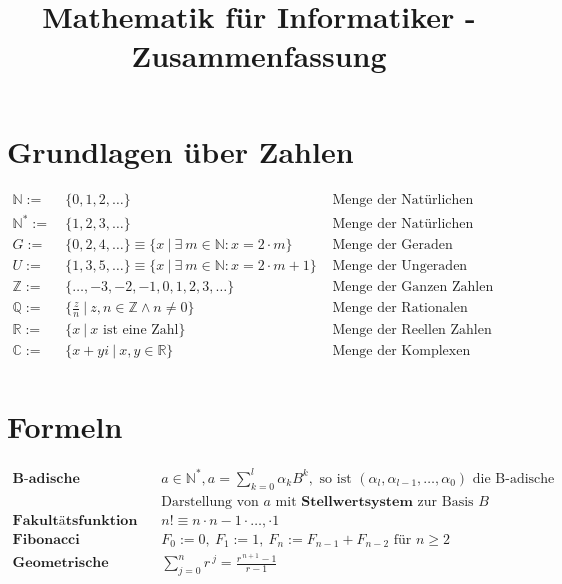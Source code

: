 \documentclass{article}
\title{Mathematik f\"ur Informatiker - Zusammenfassung}
\begin{document}
	\section*{Grundlagen \"uber Zahlen}
		\begin{align*}
			\mathbb{N} := &\ \{0, 1, 2, \ldots\} & \text{ Menge der Nat\"urlichen Zahlen}\\
			\mathbb{N}^* := &\ \{1, 2, 3, \ldots\} & \text{ Menge der Nat\"urlichen Zahlen ohne Null}\\
			G := &\ \{0, 2, 4, \ldots\} \equiv \{x\ |\ \exists\ m \in \mathbb{N}: x = 2\cdot m\} & \text{ Menge der Geraden Nat\"urliche Zahlen}\\
			U := &\ \{1, 3, 5, \ldots\} \equiv \{x\ |\ \exists\ m \in \mathbb{N}: x = 2\cdot m + 1\} & \text{ Menge der Ungeraden Nat\"urliche Zahlen}\\
			\mathbb{Z} := &\ \{\ldots, -3, -2, -1, 0, 1, 2, 3, \ldots\} & \text{ Menge der Ganzen Zahlen}\\
			\mathbb{Q} := &\ \{\frac{z}{n}\ |\ z, n \in \mathbb{Z} \wedge n \neq 0\} & \text{ Menge der Rationalen Zahlen}\\
			\mathbb{R} := &\ \{x\ |\ x \text{ ist eine Zahl}\} & \text{ Menge der Reellen Zahlen}\\
			\mathbb{C} := &\ \{x + yi\ |\ x, y \in \mathbb{R} \} & \text{ Menge der Komplexen Zahlen}\\
		\end{align*}
	\section*{Formeln}
		\begin{align*}
			\textbf{B-adische Darstellung } & a \in \mathbb{N}^*, a = \sum\limits_{k=0}^{l} \alpha_kB^k, \text{ so ist } (\alpha_l, \alpha_{l-1}, \ldots, \alpha_0) \text{ die B-adische}\\
			& \text{Darstellung von } a \text{ mit } \textbf{Stellwertsystem} \text{ zur Basis } B\\
			\textbf{Fakult\"atsfunktion } & n! \equiv n \cdot n-1 \cdot \ldots, \cdot 1\\
			\textbf{Fibonacci } & F_0 := 0,\ F_1 := 1,\ F_n := F_{n-1} + F_{n-2} \text{ f\"ur } n \geq 2\\
			\textbf{Geometrische Summenformel } & \sum\limits_{j=0}^{n} r^{\ j} = \frac{r^{\ n+1}-1}{r-1}
		\end{align*}
\end{document}
